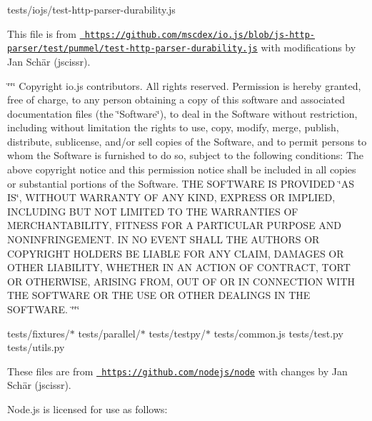 \begin{DoxyItemize}
\item tests/iojs/test-\/http-\/parser-\/durability.\+js

This file is from \href{https://github.com/mscdex/io.js/blob/js-http-parser/test/pummel/test-http-parser-durability.js}{\texttt{ https\+://github.\+com/mscdex/io.\+js/blob/js-\/http-\/parser/test/pummel/test-\/http-\/parser-\/durability.\+js}} with modifications by Jan Schär (jscissr).

\char`\"{}\char`\"{}\char`\"{}   Copyright io.\+js contributors. All rights reserved.    Permission is hereby granted, free of charge, to any person obtaining a copy   of this software and associated documentation files (the \char`\"{}Software\char`\"{}), to   deal in the Software without restriction, including without limitation the   rights to use, copy, modify, merge, publish, distribute, sublicense, and/or   sell copies of the Software, and to permit persons to whom the Software is   furnished to do so, subject to the following conditions\+:    The above copyright notice and this permission notice shall be included in   all copies or substantial portions of the Software.    THE SOFTWARE IS PROVIDED \char`\"{}AS IS\char`\"{}, WITHOUT WARRANTY OF ANY KIND, EXPRESS OR   IMPLIED, INCLUDING BUT NOT LIMITED TO THE WARRANTIES OF MERCHANTABILITY,   FITNESS FOR A PARTICULAR PURPOSE AND NONINFRINGEMENT. IN NO EVENT SHALL THE   AUTHORS OR COPYRIGHT HOLDERS BE LIABLE FOR ANY CLAIM, DAMAGES OR OTHER   LIABILITY, WHETHER IN AN ACTION OF CONTRACT, TORT OR OTHERWISE, ARISING   FROM, OUT OF OR IN CONNECTION WITH THE SOFTWARE OR THE USE OR OTHER DEALINGS   IN THE SOFTWARE.   \char`\"{}\char`\"{}\char`\"{}
\item tests/fixtures/$\ast$ tests/parallel/$\ast$ tests/testpy/$\ast$ tests/common.\+js tests/test.\+py tests/utils.\+py

These files are from \href{https://github.com/nodejs/node}{\texttt{ https\+://github.\+com/nodejs/node}} with changes by Jan Schär (jscissr).

Node.\+js is licensed for use as follows\+:


\end{DoxyItemize}
